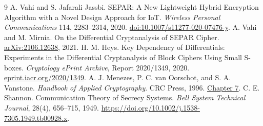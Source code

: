 \documentclass[11pt]{article}
\begin{document}
\newpage

\begin{thebibliography}{9}\small
{} A. Vahi and S. Jafarali Jassbi.
SEPAR: A New Lightweight Hybrid Encryption Algorithm with a Novel
Design Approach for IoT. \emph{Wireless Personal Communications}
114, 2283--2314, 2020.
\href{https://doi.org/10.1007/s11277-020-07476-y}
{doi:10.1007/s11277-020-07476-y}.
 A. Vahi and M. Mirnia.
On the Differential Cryptanalysis of SEPAR Cipher.
\href{https://arxiv.org/abs/2106.12638}{arXiv:2106.12638}, 2021.
 H. M. Heys.
Key Dependency of Differentials: Experiments in the Differential
Cryptanalysis of Block Ciphers Using Small S-boxes.
\emph{Cryptology ePrint Archive}, Report 2020/1349, 2020.
\href{https://eprint.iacr.org/2020/1349}{eprint.iacr.org/2020/1349}.
 A. J. Menezes, P. C. van Oorschot, and S. A. Vanstone.
\emph{Handbook of Applied Cryptography}. CRC Press, 1996.
\href{https://cacr.uwaterloo.ca/hac/about/chap7.pdf}{Chapter 7}.
C. E. Shannon.
Communication Theory of Secrecy Systems.
\emph{Bell System Technical Journal},
28(4), 656--715, 1949.
\url{https://doi.org/10.1002/j.1538-7305.1949.tb00928.x}.
\end{thebibliography}
\end{document}
